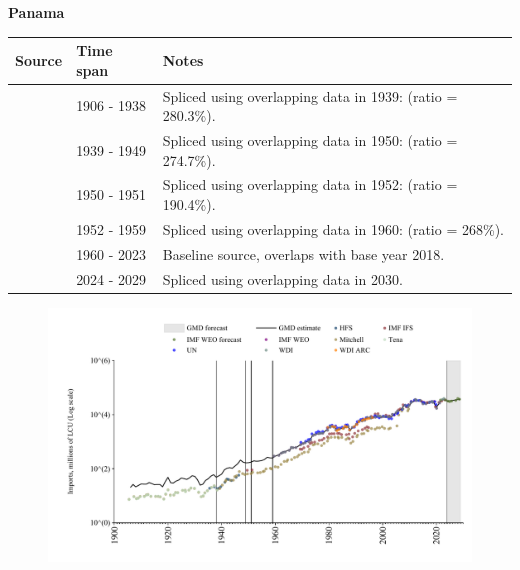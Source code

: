 \documentclass[12pt,a4paper,landscape]{article}
\begin{document}
\begin{adjustbox}{max totalsize={\paperwidth}{\paperheight},center}
\begin{minipage}[t][\textheight][t]{\textwidth}
\vspace*{0.5cm}
{}
\begin{center}
{\Large\bfseries Panama}
\end{center}
\vspace{0.5cm}
\begin{table}[H]
\centering
\small
\begin{tabular}{|l|l|l|}
\hline
\textbf{Source} & \textbf{Time span} & \textbf{Notes} \\
\hline
\rowcolor{white}\cite{Tena}& 1906 - 1938 &Spliced using overlapping data in 1939: (ratio = 280.3\%).\\
\rowcolor{lightgray}\cite{Mitchell}& 1939 - 1949 &Spliced using overlapping data in 1950: (ratio = 274.7\%).\\
\rowcolor{white}\cite{IMF_IFS}& 1950 - 1951 &Spliced using overlapping data in 1952: (ratio = 190.4\%).\\
\rowcolor{lightgray}\cite{Mitchell}& 1952 - 1959 &Spliced using overlapping data in 1960: (ratio = 268\%).\\
\rowcolor{white}\cite{WDI}& 1960 - 2023 &Baseline source, overlaps with base year 2018.\\
\rowcolor{lightgray}\cite{IMF_WEO_forecast}& 2024 - 2029 &Spliced using overlapping data in 2030.\\
\hline
\end{tabular}
\end{table}
\begin{figure}[H]
\centering
\includegraphics[width=\textwidth,height=0.6\textheight,keepaspectratio]{graphs/PAN_imports.pdf}
\end{figure}
\end{minipage}
\end{adjustbox}
\end{document}
